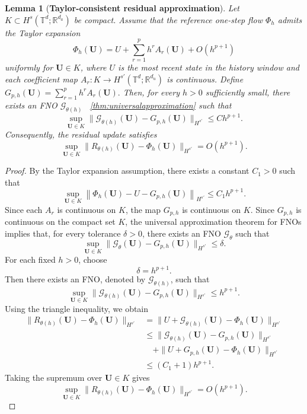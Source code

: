 \documentclass[11pt,a4paper]{article}
\newtheorem{lemma}[theorem]{Lemma}
\theoremstyle{definition}
\theoremstyle{remark}
\numberwithin{equation}{section}
\numberwithin{figure}{section}
\numberwithin{table}{section}
\begin{document}
\begin{lemma}[\textbf{Taylor-consistent residual approximation}]
\label{lem:taylor_consistent_residual}
Let \(K\subset H^s(\mathbb T^d;\mathbb R^{d_a})\) be compact. Assume that the
reference one-step flow \(\Phi_h\) admits the Taylor expansion
\[
    \Phi_h(\mathbf U)
    =
    U+\sum_{r=1}^{p} h^r A_r(\mathbf U)
    +
    O(h^{p+1})
\]
uniformly for \(\mathbf U\in K\), where \(U\) is the most recent state in the
history window and each coefficient map
$ A_r:K\to H^{s'}(\mathbb T^d;\mathbb R^{d_u})$
is continuous. Define
$ G_{p,h}(\mathbf U)
    =
    \sum_{r=1}^{p} h^r A_r(\mathbf U).$
Then, for every \(h>0\) sufficiently small, there exists an FNO
\(\mathcal G_{\theta(h)}\) ~\ref{thm:universalapproximation} such that
\[
    \sup_{\mathbf U\in K}
    \|\mathcal G_{\theta(h)}(\mathbf U)-G_{p,h}(\mathbf U)\|_{H^{s'}}
    \le
    C h^{p+1}.
\]
Consequently, the residual update
satisfies
\[
    \sup_{\mathbf U\in K}
    \|R_{\theta(h)}(\mathbf U)-\Phi_h(\mathbf U)\|_{H^{s'}}
    =
    O(h^{p+1}).
\]
\end{lemma}

\begin{proof}
By the Taylor expansion assumption, there exists a constant \(C_1>0\) such
that
\[
    \sup_{\mathbf U\in K}
    \left\|
    \Phi_h(\mathbf U)
    -
    U
    -
    G_{p,h}(\mathbf U)
    \right\|_{H^{s'}}
    \le
    C_1h^{p+1}.
\]
Since each \(A_r\) is continuous on \(K\), the map \(G_{p,h}\) is continuous on
\(K\). Since \(G_{p,h}\) is continuous on the compact set \(K\), the universal
approximation theorem for FNOs implies that, for every tolerance
\(\delta>0\), there exists an FNO \(\mathcal G_\theta\) such that
\[
    \sup_{\mathbf U\in K}
    \|\mathcal G_\theta(\mathbf U)-G_{p,h}(\mathbf U)\|_{H^{s'}}
    \le
    \delta .
\]
For each fixed \(h>0\), choose
\[
    \delta=h^{p+1}.
\]
Then there exists an FNO, denoted by \(\mathcal G_{\theta(h)}\), such that
\[
    \sup_{\mathbf U\in K}
    \|\mathcal G_{\theta(h)}(\mathbf U)-G_{p,h}(\mathbf U)\|_{H^{s'}}
    \le
    h^{p+1}.
\]
Using the triangle inequality, we obtain
\[
\begin{aligned}
    \|R_{\theta(h)}(\mathbf U)-\Phi_h(\mathbf U)\|_{H^{s'}}
    &=
    \|U+\mathcal G_{\theta(h)}(\mathbf U)-\Phi_h(\mathbf U)\|_{H^{s'}} \\
    &\le
    \|\mathcal G_{\theta(h)}(\mathbf U)-G_{p,h}(\mathbf U)\|_{H^{s'}} \\
    &\quad+
    \|U+G_{p,h}(\mathbf U)-\Phi_h(\mathbf U)\|_{H^{s'}} \\
    &\le
    (C_1+1)h^{p+1}.
\end{aligned}
\]
Taking the supremum over \(\mathbf U\in K\) gives
\[
    \sup_{\mathbf U\in K}
    \|R_{\theta(h)}(\mathbf U)-\Phi_h(\mathbf U)\|_{H^{s'}}
    =
    O(h^{p+1}).
\]
\end{proof}
\end{document}
